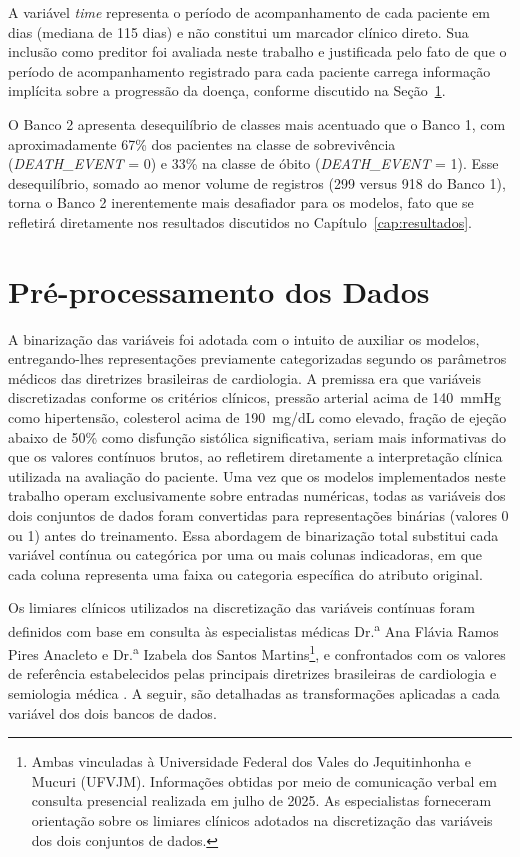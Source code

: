 A variável \textit{time} representa o período de acompanhamento de cada paciente em dias (mediana de 115 dias) e não constitui um marcador clínico direto. Sua inclusão como preditor foi avaliada neste trabalho e justificada pelo fato de que o período de acompanhamento registrado para cada paciente carrega informação implícita sobre a progressão da doença, conforme discutido na Seção~\ref{sec:preprocessamento}.

O Banco 2 apresenta desequilíbrio de classes mais acentuado que o Banco 1, com aproximadamente 67\% dos pacientes na classe de sobrevivência (\textit{DEATH\_EVENT} = 0) e 33\% na classe de óbito (\textit{DEATH\_EVENT} = 1). Esse desequilíbrio, somado ao menor volume de registros (299 versus 918 do Banco 1), torna o Banco 2 inerentemente mais desafiador para os modelos, fato que se refletirá diretamente nos resultados discutidos no Capítulo~\ref{cap:resultados}.

\section{Pré-processamento dos Dados}
\label{sec:preprocessamento}

A binarização das variáveis foi adotada com o intuito de auxiliar os modelos, entregando-lhes representações previamente categorizadas segundo os parâmetros médicos das diretrizes brasileiras de cardiologia. A premissa era que variáveis discretizadas conforme os critérios clínicos, pressão arterial acima de 140~mmHg como hipertensão, colesterol acima de 190~mg/dL como elevado, fração de ejeção abaixo de 50\% como disfunção sistólica significativa, seriam mais informativas do que os valores contínuos brutos, ao refletirem diretamente a interpretação clínica utilizada na avaliação do paciente. Uma vez que os modelos implementados neste trabalho operam exclusivamente sobre entradas numéricas, todas as variáveis dos dois conjuntos de dados foram convertidas para representações binárias (valores 0 ou 1) antes do treinamento. Essa abordagem de binarização total substitui cada variável contínua ou categórica por uma ou mais colunas indicadoras, em que cada coluna representa uma faixa ou categoria específica do atributo original.

Os limiares clínicos utilizados na discretização das variáveis contínuas foram definidos com base em consulta às especialistas médicas Dr.\textsuperscript{a} Ana Flávia Ramos Pires Anacleto e Dr.\textsuperscript{a} Izabela dos Santos Martins\footnote{Ambas vinculadas à Universidade Federal dos Vales do Jequitinhonha e Mucuri (UFVJM). Informações obtidas por meio de comunicação verbal em consulta presencial realizada em julho de 2025. As especialistas forneceram orientação sobre os limiares clínicos adotados na discretização das variáveis dos dois conjuntos de dados.}, e confrontados com os valores de referência estabelecidos pelas principais diretrizes brasileiras de cardiologia e semiologia médica \cite{brandao2025,rached2025,rohde2018,porto2019}. A seguir, são detalhadas as transformações aplicadas a cada variável dos dois bancos de dados.

